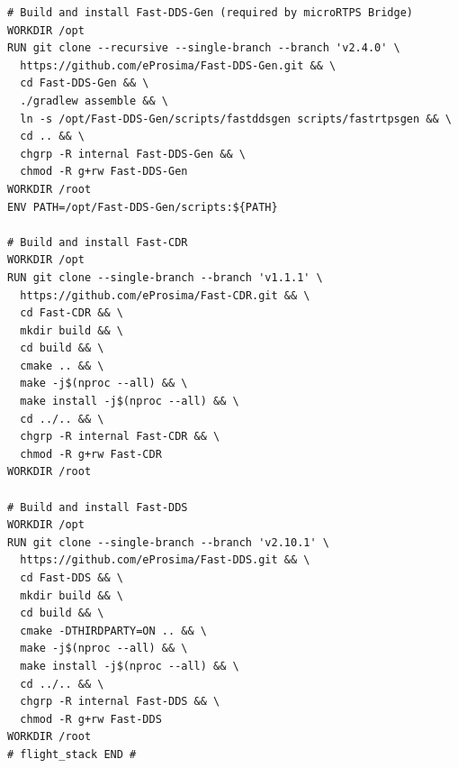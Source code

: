 \begin{center}
\begin{lstlisting}[caption={Unit configuration of the \texttt{x86-cudev} target of the \texttt{flight\_stack} DUA unit \cite{masocco_flight_stack_nodate} as of November 26, 2024.}, label={lst:flightstackdev}]
# Build and install Fast-DDS-Gen (required by microRTPS Bridge)
WORKDIR /opt
RUN git clone --recursive --single-branch --branch 'v2.4.0' \
  https://github.com/eProsima/Fast-DDS-Gen.git && \
  cd Fast-DDS-Gen && \
  ./gradlew assemble && \
  ln -s /opt/Fast-DDS-Gen/scripts/fastddsgen scripts/fastrtpsgen && \
  cd .. && \
  chgrp -R internal Fast-DDS-Gen && \
  chmod -R g+rw Fast-DDS-Gen
WORKDIR /root
ENV PATH=/opt/Fast-DDS-Gen/scripts:${PATH}

# Build and install Fast-CDR
WORKDIR /opt
RUN git clone --single-branch --branch 'v1.1.1' \
  https://github.com/eProsima/Fast-CDR.git && \
  cd Fast-CDR && \
  mkdir build && \
  cd build && \
  cmake .. && \
  make -j$(nproc --all) && \
  make install -j$(nproc --all) && \
  cd ../.. && \
  chgrp -R internal Fast-CDR && \
  chmod -R g+rw Fast-CDR
WORKDIR /root

# Build and install Fast-DDS
WORKDIR /opt
RUN git clone --single-branch --branch 'v2.10.1' \
  https://github.com/eProsima/Fast-DDS.git && \
  cd Fast-DDS && \
  mkdir build && \
  cd build && \
  cmake -DTHIRDPARTY=ON .. && \
  make -j$(nproc --all) && \
  make install -j$(nproc --all) && \
  cd ../.. && \
  chgrp -R internal Fast-DDS && \
  chmod -R g+rw Fast-DDS
WORKDIR /root
# flight_stack END #
\end{lstlisting}
\end{center}
